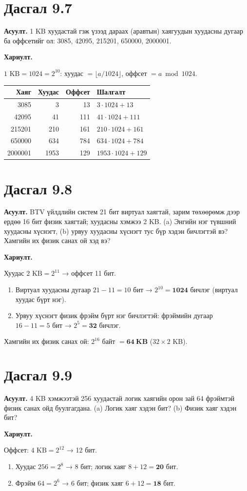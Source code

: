 \documentclass[12pt,a4paper]{article}
\newcommand{\question}[2]{\section{Дасгал #1}\textbf{Асуулт.} #2\par\medskip\textbf{Хариулт.}\par}
\begin{document}
\question{9.7}{1 KB хуудастай гэж үзээд дараах (аравтын) хаягуудын хуудасны дугаар ба оффсетийг ол: 3085, 42095, 215201, 650000, 2000001.}

$1\text{ KB} = 1024 = 2^{10}$: хуудас $= \lfloor a / 1024 \rfloor$, оффсет $= a \bmod 1024$.
\begin{center}
\begin{tabular}{rrrl}
\toprule
Хаяг & Хуудас & Оффсет & Шалгалт\\
\midrule
3085 & 3 & 13 & $3 \cdot 1024 + 13$\\
42095 & 41 & 111 & $41 \cdot 1024 + 111$\\
215201 & 210 & 161 & $210 \cdot 1024 + 161$\\
650000 & 634 & 784 & $634 \cdot 1024 + 784$\\
2000001 & 1953 & 129 & $1953 \cdot 1024 + 129$\\
\bottomrule
\end{tabular}
\end{center}

\question{9.8}{BTV үйлдлийн систем 21 бит виртуал хаягтай, зарим төхөөрөмж дээр ердөө 16 бит физик хаягтай; хуудасны хэмжээ 2 KB. (a) Энгийн нэг түвшний хуудасны хүснэгт, (b) урвуу хуудасны хүснэгт тус бүр хэдэн бичлэгтэй вэ? Хамгийн их физик санах ой хэд вэ?}

Хуудас $2\text{ KB} = 2^{11}$ → оффсет 11 бит.
\begin{enumerate}[label=(\alph*), leftmargin=1.5em]
  \item Виртуал хуудасны дугаар $21 - 11 = 10$ бит → $2^{10} = \mathbf{1024}$ бичлэг (виртуал хуудас бүрт нэг).
  \item Урвуу хүснэгт физик фрэйм бүрт нэг бичлэгтэй: фрэймийн дугаар $16 - 11 = 5$ бит → $2^5 = \mathbf{32}$ бичлэг.
\end{enumerate}
Хамгийн их физик санах ой: $2^{16}$ байт $= \mathbf{64\ KB}$ ($32 \times 2$ KB).

\question{9.9}{4 KB хэмжээтэй 256 хуудастай логик хаягийн орон зай 64 фрэймтэй физик санах ойд буулгагдана. (a) Логик хаяг хэдэн бит? (b) Физик хаяг хэдэн бит?}

Оффсет: $4\text{ KB} = 2^{12}$ → 12 бит.
\begin{enumerate}[label=(\alph*), leftmargin=1.5em]
  \item Хуудас $256 = 2^8$ → 8 бит; логик хаяг $8 + 12 = \mathbf{20}$ бит.
  \item Фрэйм $64 = 2^6$ → 6 бит; физик хаяг $6 + 12 = \mathbf{18}$ бит.
\end{enumerate}
\end{document}
